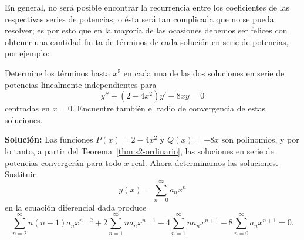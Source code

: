 En general, no será posible encontrar la recurrencia entre los coeficientes de las respectivas series de potencias, o ésta será tan complicada que no se pueda resolver; es por esto que en la mayoría de las ocasiones debemos ser felices con obtener una cantidad finita de términos de cada solución en serie de potencias, por ejemplo:
 
\begin{example}\label{ex:s2-tres}
    Determine los términos hasta $x^5$ en cada una de las dos soluciones en serie de potencias linealmente independientes para
\[ y'' + (2 - 4x^2)y' - 8xy = 0 \]
centradas en $x = 0$. Encuentre también el radio de convergencia de estas soluciones.
 
\noindent \textbf{Solución:} \quad Las funciones $P(x) = 2 - 4x^2$ y $Q(x) = -8x$ son polinomios, y por lo tanto, a partir del Teorema~\ref{thm:s2-ordinario}, las soluciones en serie de potencias convergerán para todo $x$ real. Ahora determinamos las soluciones. Sustituir
\begin{equation}
y(x) = \sum_{n=0}^{\infty} a_n x^n
\label{eq:s2-ansatz-3}
\end{equation}
en la ecuación diferencial dada produce
\[ \sum_{n=2}^{\infty} n(n-1)a_n x^{n-2} + 2\sum_{n=1}^{\infty} n a_n x^{n-1} - 4\sum_{n=1}^{\infty} n a_n x^{n+1} - 8\sum_{n=0}^{\infty} a_n x^{n+1} = 0. \]
 

\end{example}
